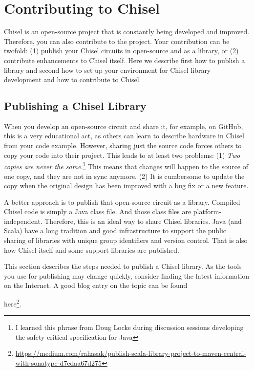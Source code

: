 \documentclass[%
    10pt,
    headinclude, footexclude,
    openright, %
    notitlepage,
    cleardoubleempty,
    headsepline,
    pointlessnumbers,
    bibtotoc, idxtotoc,
    ]{scrbook}
\newif\ifbook
\newcommand{\myref}[2]{\href{#1}{#2}}
\renewcommand{\myref}[2]{{#2}{\footnote{\url{#1}}}}
\begin{document}
\chapter{Contributing to Chisel}


Chisel is an open-source project that is constantly being developed and improved.
Therefore, you can also contribute to the project. Your contribution can be twofold:
(1) publish your Chisel circuits in open-source and as a library, or (2) contribute
enhancements to Chisel itself.
Here we describe first how to publish a library and second how to
set up your environment for Chisel library development and how to contribute
to Chisel.

\section{Publishing a Chisel Library}

When you develop an open-source circuit and share it, for example, on GitHub,
this is a very educational act, as others can learn to describe hardware in Chisel from your code example.
However, sharing just the source code forces others to copy your code into their
project. This leads to at least two problems: (1) \emph{Two copies are never the
same}.\footnote{I learned this phrase from Doug Locke during discussion sessions
developing the safety-critical specification for Java} This means that changes will
happen to the source of one copy, and they are not in sync anymore.
(2) It is cumbersome to update the copy when the original design has been improved
with a bug fix or a new feature.

A better approach is to publish that open-source circuit as a library.
Compiled Chisel code is simply a Java class file. And those class files are
platform-independent. Therefore, this is an ideal way to share Chisel libraries.
Java (and Scala) have a long tradition and good infrastructure to support
the public sharing of libraries with unique group identifiers and version control.
That is also how Chisel itself and some support libraries are published.

This section describes the steps needed to publish a Chisel library. As the tools you
use for publishing may change quickly, consider finding the latest information on the
Internet. A good blog entry on the topic can be found
\ifbook
\myref{https://medium.com/rahasak/}{here}.
\else
\myref{https://medium.com/rahasak/publish-scala-library-project-to-maven-central-with-sonatype-d7edaa67d275}{here}.
\fi
\end{document}
